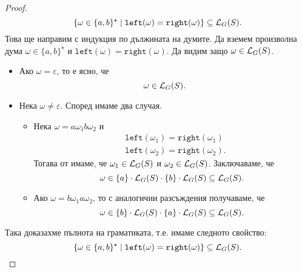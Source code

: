 \begin{proof}
\begin{equation}
    \{\omega \in \{a,b\}^\star \mid \texttt{left}(\omega) = \texttt{right}(\omega)\} \subseteq \mathcal{L}_G(S).
  \end{equation}
  Това ще направим с индукция по дължината на думите.
  Да вземем произволна дума $\omega \in \{a,b\}^\star$ и $\texttt{left}(\omega) = \texttt{right}(\omega)$.
  Да видим защо $\omega \in \mathcal{L}_G(S)$.
  \begin{itemize}
  \item 
    Ако $\omega = \varepsilon$, то е ясно, че
    \[\omega \in \mathcal{L}_G(S).\]
  \item
    Нека $\omega \neq \varepsilon$. Според  имаме два случая.
    \begin{itemize}
    \item
      Нека $\omega = a \omega_1 b \omega_2$ и
      \begin{align*}
        & \texttt{left}(\omega_1) = \texttt{right}(\omega_1)\\
        & \texttt{left}(\omega_2) = \texttt{right}(\omega_2).
      \end{align*}
      Тогава от \IndHyp имаме, че $\omega_1 \in \mathcal{L}_G(S)$ и $\omega_2 \in \mathcal{L}_G(S)$. Заключаваме, че
      \[\omega \in \{a\} \cdot \mathcal{L}_G(S) \cdot \{b\} \cdot \mathcal{L}_G(S) \subseteq \mathcal{L}_G(S).\]
    \item
      Ако $\omega = b \omega_1 a \omega_2$, то с аналогични разсъждения получаваме, че
      \[\omega \in \{b\} \cdot \mathcal{L}_G(S) \cdot \{a\} \cdot \mathcal{L}_G(S) \subseteq \mathcal{L}_G(S).\]
    \end{itemize}
  \end{itemize}
  Така доказахме пълнота на граматиката, т.е. имаме следното свойство:
  \[\{\omega \in \{a,b\}^\star \mid \texttt{left}(\omega) = \texttt{right}(\omega)\} \subseteq \mathcal{L}_G(S).\]
\end{proof}

